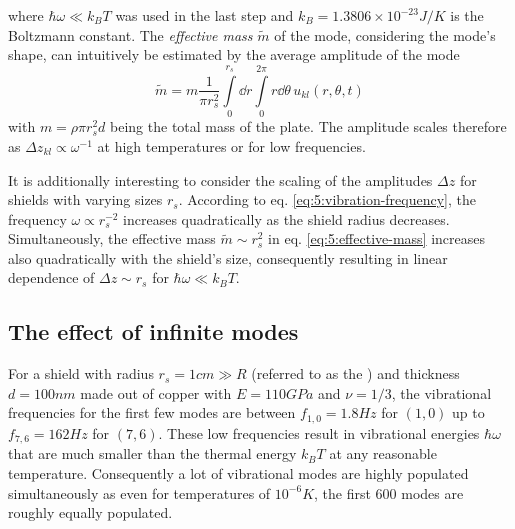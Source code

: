 where $\hbar\omega \ll k_B T$ was used in the last step and $k_B = 1.3806\times 10^{-23} \si{J/K}$ is the Boltzmann constant.
The \textit{effective mass} $\tilde{m}$ of the mode, considering the mode's shape, can intuitively be estimated by the average amplitude of the mode 
\begin{equation}\label{eq:5:effective-mass}
  \tilde{m} = m\frac{1}{\pi r_s^2}\int\limits_0^{r_s} \dd r \int\limits_0^{2\pi} r\dd\theta \, u_{kl}(r, \theta, t)
\end{equation}
with $m=\rho \pi r_s^2 d$ being the total mass of the plate.
The amplitude scales therefore as $\Delta z_{kl} \propto \omega^{-1}$ at high temperatures or for low frequencies.

It is additionally interesting to consider the scaling of the amplitudes $\Delta z$ for shields with varying sizes $r_s$.
According to eq. \eqref{eq:5:vibration-frequency}, the frequency $\omega\propto r_s^{-2}$ increases quadratically as the shield radius decreases.
Simultaneously, the effective mass $\tilde{m} \sim r_s^2$ in eq. \eqref{eq:5:effective-mass} increases also quadratically with the shield's size, consequently resulting in linear dependence of $\Delta z \sim r_s$ for $\hbar \omega \ll k_B T$.




\subsection*{The effect of infinite modes}
For a shield with radius $r_s = 1\si{cm} \gg R$ (referred to as the ) and thickness $d=100\si{nm}$ made out of copper with $E = 110\si{GPa}$ and $\nu = 1/3$, the vibrational frequencies for the first few modes are between $f_{1,0}=1.8 \si{Hz}$ for $(1,0)$ up to $f_{7,6} = 162 \si{Hz}$ for $(7,6)$.
These low frequencies result in vibrational energies $\hbar \omega$ that are much smaller than the thermal energy $k_B T$ at any reasonable temperature.
Consequently a lot of vibrational modes are highly populated simultaneously as even for temperatures of $10^{-6}\si{K}$, the first 600 modes are roughly equally populated.

